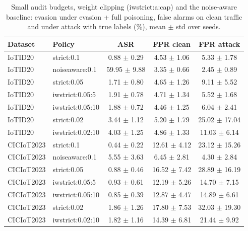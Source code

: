 \begin{table}[t]
\centering
\caption{Small audit budgets, weight clipping (iwstrict:a:cap) and the noise-aware baseline: evasion under evasion + full poisoning, false alarms on clean traffic and under attack with true labels (\%), mean $\pm$ std over seeds.}
\label{tab:lowbudget}
\footnotesize
\setlength{\tabcolsep}{3pt}
\begin{tabular}{llccc}
\toprule
Dataset & Policy & ASR & FPR clean & FPR attack \\
\midrule
IoTID20 & strict:0.1 & 0.88 $\pm$ 0.29 & 4.53 $\pm$ 1.06 & 5.33 $\pm$ 1.78 \\
IoTID20 & noiseaware:0.1 & 59.95 $\pm$ 9.88 & 3.35 $\pm$ 0.66 & 2.45 $\pm$ 0.89 \\
IoTID20 & strict:0.05 & 1.71 $\pm$ 0.80 & 4.65 $\pm$ 1.26 & 9.11 $\pm$ 5.52 \\
IoTID20 & iwstrict:0.05:5 & 1.91 $\pm$ 0.78 & 4.71 $\pm$ 1.34 & 5.52 $\pm$ 1.68 \\
IoTID20 & iwstrict:0.05:10 & 1.88 $\pm$ 0.72 & 4.46 $\pm$ 1.25 & 6.04 $\pm$ 2.41 \\
IoTID20 & strict:0.02 & 3.44 $\pm$ 1.12 & 5.20 $\pm$ 1.79 & 25.02 $\pm$ 17.04 \\
IoTID20 & iwstrict:0.02:10 & 4.03 $\pm$ 1.25 & 4.86 $\pm$ 1.33 & 11.03 $\pm$ 6.14 \\
CICIoT2023 & strict:0.1 & 0.44 $\pm$ 0.22 & 12.61 $\pm$ 4.12 & 23.12 $\pm$ 15.26 \\
CICIoT2023 & noiseaware:0.1 & 5.55 $\pm$ 3.63 & 6.45 $\pm$ 2.81 & 4.30 $\pm$ 2.84 \\
CICIoT2023 & strict:0.05 & 0.88 $\pm$ 0.46 & 16.52 $\pm$ 7.42 & 28.89 $\pm$ 16.19 \\
CICIoT2023 & iwstrict:0.05:5 & 0.93 $\pm$ 0.61 & 12.19 $\pm$ 5.26 & 14.70 $\pm$ 7.15 \\
CICIoT2023 & iwstrict:0.05:10 & 0.85 $\pm$ 0.39 & 12.87 $\pm$ 4.47 & 14.89 $\pm$ 6.61 \\
CICIoT2023 & strict:0.02 & 1.86 $\pm$ 1.26 & 17.80 $\pm$ 7.53 & 32.03 $\pm$ 19.30 \\
CICIoT2023 & iwstrict:0.02:10 & 1.82 $\pm$ 1.16 & 14.39 $\pm$ 6.81 & 21.44 $\pm$ 9.92 \\
\bottomrule
\end{tabular}
\end{table}
